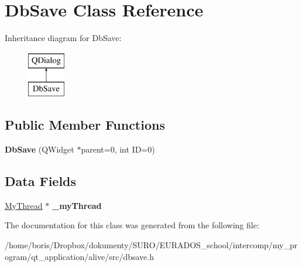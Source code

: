 \hypertarget{classDbSave}{\section{Db\-Save Class Reference}
\label{classDbSave}
}
Inheritance diagram for Db\-Save\-:\begin{figure}[H]
\begin{center}
\leavevmode
\includegraphics[height=2.000000cm]{classDbSave}
\end{center}
\end{figure}
\subsection*{Public Member Functions}
\begin{DoxyCompactItemize}
\item 
\hypertarget{classDbSave_a1cfb1f1272dd81fc3dd9451701471c98}{{\bfseries Db\-Save} (Q\-Widget $\ast$parent=0, int I\-D=0)}\label{classDbSave_a1cfb1f1272dd81fc3dd9451701471c98}

\end{DoxyCompactItemize}
\subsection*{Data Fields}
\begin{DoxyCompactItemize}
\item 
\hypertarget{classDbSave_a249538c80ad9ad31a9daf0d7ff99b646}{\hyperlink{classMyThread}{My\-Thread} $\ast$ {\bfseries \-\_\-my\-Thread}}\label{classDbSave_a249538c80ad9ad31a9daf0d7ff99b646}

\end{DoxyCompactItemize}


The documentation for this class was generated from the following file\-:\begin{DoxyCompactItemize}
\item 
/home/boris/\-Dropbox/dokumenty/\-S\-U\-R\-O/\-E\-U\-R\-A\-D\-O\-S\-\_\-school/intercomp/my\-\_\-program/qt\-\_\-application/alive/src/dbsave.\-h\end{DoxyCompactItemize}

